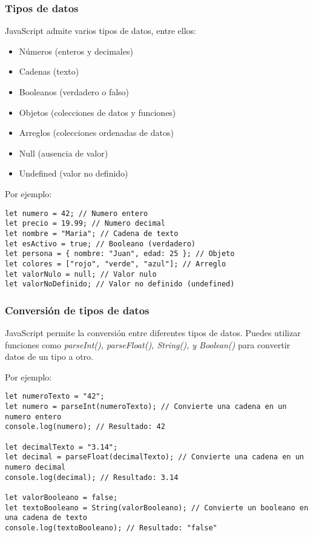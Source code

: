 \documentclass[executivepaper]{article}
\begin{document}
\subsubsection*{Tipos de datos}
JavaScript admite varios tipos de datos, entre ellos:
\begin{itemize}
  \item Números (enteros y decimales)
  \item Cadenas (texto)
  \item Booleanos (verdadero o falso)
  \item Objetos (colecciones de datos y funciones)
  \item Arreglos (colecciones ordenadas de datos)
  \item Null (ausencia de valor)
  \item Undefined (valor no definido)
\end{itemize}

Por ejemplo:
\begin{lstlisting}
let numero = 42; // Numero entero
let precio = 19.99; // Numero decimal
let nombre = "Maria"; // Cadena de texto
let esActivo = true; // Booleano (verdadero)
let persona = { nombre: "Juan", edad: 25 }; // Objeto
let colores = ["rojo", "verde", "azul"]; // Arreglo
let valorNulo = null; // Valor nulo
let valorNoDefinido; // Valor no definido (undefined)
\end{lstlisting}

\subsubsection*{Conversión de tipos de datos}
JavaScript permite la conversión entre diferentes tipos de datos. Puedes utilizar funciones como \emph{parseInt(), parseFloat(), String(), y Boolean()} para convertir datos de un tipo a otro.

Por ejemplo:
\begin{lstlisting}
let numeroTexto = "42";
let numero = parseInt(numeroTexto); // Convierte una cadena en un numero entero
console.log(numero); // Resultado: 42

let decimalTexto = "3.14";
let decimal = parseFloat(decimalTexto); // Convierte una cadena en un numero decimal
console.log(decimal); // Resultado: 3.14

let valorBooleano = false;
let textoBooleano = String(valorBooleano); // Convierte un booleano en una cadena de texto
console.log(textoBooleano); // Resultado: "false"
\end{lstlisting}
\end{document}
